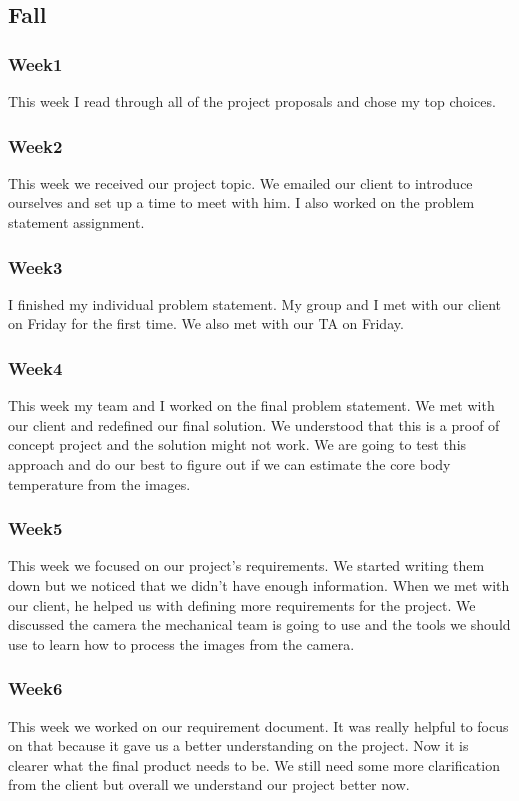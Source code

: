 \subsection*{Fall}
\subsubsection*{Week1}
	This week I read through all of the project proposals and chose my top choices. 
\subsubsection*{Week2}
	This week we received our project topic. We emailed our client to introduce ourselves and set up a time to meet with him. I also worked on the problem statement assignment. 
\subsubsection*{Week3}
	I finished my individual problem statement. My group and I met with our client on Friday for the first time. We also met with our TA on Friday. 
\subsubsection*{Week4}
	This week my team and I worked on the final problem statement.  We met with our client and redefined our final solution. We understood that this is a proof of concept project and the solution might not work. We are going to test this approach and do our best to figure out if we can estimate the core body temperature from the images. 
\subsubsection*{Week5}
	This week we focused on our project's requirements. We started writing them down but we noticed that we didn’t have enough information. When we met with our client, he helped us with defining more requirements for the project. We discussed the camera the mechanical team is going to use and the tools we should use to learn how to process the images from the camera. 
\subsubsection*{Week6}
	This week we worked on our requirement  document. It was really helpful to focus on that because it gave us a better understanding on the project. Now it is clearer what the final product needs to be. We still need some more clarification from the client but overall we understand our project better now.
